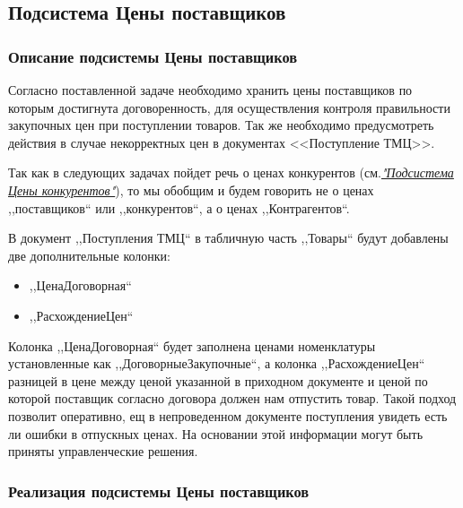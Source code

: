 \subsection{Подсистема Цены поставщиков}
\subsubsection{Описание подсистемы Цены поставщиков}
Согласно поставленной задаче необходимо хранить цены поставщиков по которым достигнута договоренность, для осуществления контроля правильности закупочных цен при поступлении товаров. Так же  необходимо предусмотреть действия в случае некорректных цен  в документах <<Поступление ТМЦ>>. 
\par
Так как в следующих задачах пойдет речь о ценах конкурентов  (см.\hyperlink{5_1}{\textit {"Подсистема Цены конкурентов"}}), то мы обобщим и будем говорить не о ценах ,,поставщиков`` или ,,конкурентов``, а о ценах ,,Контрагентов``.  
\par
В документ ,,Поступления ТМЦ`` в табличную часть ,,Товары`` будут добавлены две дополнительные колонки:
\begin{itemize}	
	\item ,,ЦенаДоговорная``
	\item ,,РасхождениеЦен``
\end{itemize}		
Колонка ,,ЦенаДоговорная`` будет заполнена ценами номенклатуры установленные как ,,ДоговорныеЗакупочные``, а колонка ,,РасхождениеЦен`` разницей в цене между ценой указанной в приходном документе и ценой по которой поставщик согласно договора должен нам отпустить товар.	Такой подход позволит оперативно, ещ в непроведенном документе поступления увидеть есть ли ошибки в отпускных ценах. На основании этой информации могут быть приняты управленческие решения.
\subsubsection{Реализация подсистемы Цены поставщиков}
